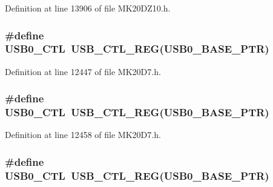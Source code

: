 Definition at line 13906 of file M\+K20\+D\+Z10.\+h.

\subsubsection[{\texorpdfstring{U\+S\+B0\+\_\+\+C\+TL}{USB0_CTL}}]{\setlength{\rightskip}{0pt plus 5cm}\#define U\+S\+B0\+\_\+\+C\+TL~{\bf U\+S\+B\+\_\+\+C\+T\+L\+\_\+\+R\+EG}({\bf U\+S\+B0\+\_\+\+B\+A\+S\+E\+\_\+\+P\+TR})}\hypertarget{group___u_s_b___register___accessor___macros_ga9fd87834397651248f8b4be577821ff3}{}\label{group___u_s_b___register___accessor___macros_ga9fd87834397651248f8b4be577821ff3}


Definition at line 12447 of file M\+K20\+D7.\+h.

\subsubsection[{\texorpdfstring{U\+S\+B0\+\_\+\+C\+TL}{USB0_CTL}}]{\setlength{\rightskip}{0pt plus 5cm}\#define U\+S\+B0\+\_\+\+C\+TL~{\bf U\+S\+B\+\_\+\+C\+T\+L\+\_\+\+R\+EG}({\bf U\+S\+B0\+\_\+\+B\+A\+S\+E\+\_\+\+P\+TR})}\hypertarget{group___u_s_b___register___accessor___macros_ga9fd87834397651248f8b4be577821ff3}{}\label{group___u_s_b___register___accessor___macros_ga9fd87834397651248f8b4be577821ff3}


Definition at line 12458 of file M\+K20\+D7.\+h.

\subsubsection[{\texorpdfstring{U\+S\+B0\+\_\+\+C\+TL}{USB0_CTL}}]{\setlength{\rightskip}{0pt plus 5cm}\#define U\+S\+B0\+\_\+\+C\+TL~{\bf U\+S\+B\+\_\+\+C\+T\+L\+\_\+\+R\+EG}({\bf U\+S\+B0\+\_\+\+B\+A\+S\+E\+\_\+\+P\+TR})}\hypertarget{group___u_s_b___register___accessor___macros_ga9fd87834397651248f8b4be577821ff3}{}\label{group___u_s_b___register___accessor___macros_ga9fd87834397651248f8b4be577821ff3}



